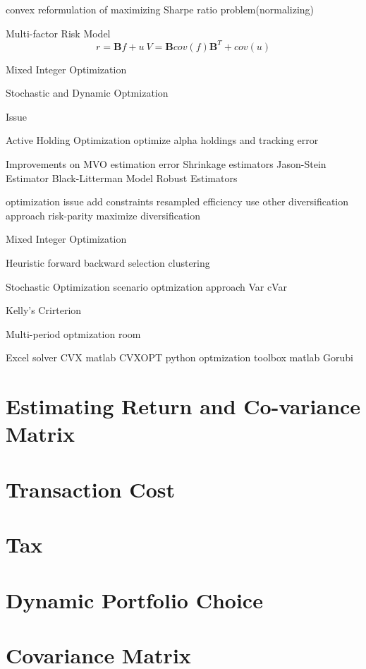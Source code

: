 \documentclass[11pt, openany]{book}              %
\begin{document}
   convex reformulation of maximizing Sharpe ratio problem(normalizing) 


  Multi-factor Risk Model 
    $$r = \mathbf{B}f + u ~ V = \mathbf{B}cov(f)\mathbf{B}^T + cov(u)$$ 
   
   Mixed Integer Optimization


   Stochastic and Dynamic Optmization


Issue 


	Active Holding Optimization
              optimize alpha holdings and tracking error



Improvements on MVO
   estimation error
  	Shrinkage estimators
		Jason-Stein Estimator  
	Black-Litterman Model
	Robust Estimators

    optimization issue
	add constraints
	resampled efficiency
	use other diversification approach 
		risk-parity 
  		maximize diversification		




Mixed Integer Optimization

Heuristic
  forward
  backward selection
  clustering


Stochastic Optimization
scenario optmization approach
Var
cVar

 Kelly’s Crirterion 

Multi-period optmization room




Excel solver
 CVX matlab
CVXOPT python
optmization toolbox matlab
Gorubi




\section{Estimating Return and Co-variance Matrix}
\section{Transaction Cost}
\section{Tax}
\section{Dynamic Portfolio Choice}
\section{Covariance Matrix}
\end{document}
